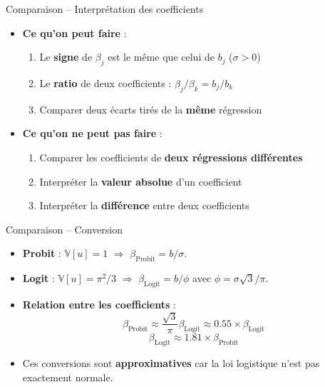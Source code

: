 \documentclass[11pt,aspectratio=169]{beamer}
\newcommand{\V}{\mathbb{V}}
\begin{document}
\begin{frame}{Comparaison -- Interprétation des coefficients}

\begin{itemize}

\item \textbf{Ce qu'on peut faire} :
  \begin{enumerate}
  \item Le \textbf{signe} de $\beta_j$ est le même que celui de $b_j$
    ($\sigma > 0$)\newline
  \item Le \textbf{ratio} de deux coefficients : $\beta_j/\beta_k = b_j/b_k$\newline
  \item Comparer deux écarts tirés de la \textbf{même} régression
  \end{enumerate}

\item \textbf{Ce qu'on ne peut pas faire} :
  \begin{enumerate}
  \item Comparer les coefficients de \textbf{deux régressions différentes}\newline
  \item Interpréter la \textbf{valeur absolue} d'un coefficient\newline
  \item Interpréter la \textbf{différence} entre deux coefficients
  \end{enumerate}

\end{itemize}

\end{frame}

\begin{frame}{Comparaison -- Conversion}

\begin{itemize}

\item \textbf{Probit} : $\V[u] = 1$ $\Rightarrow$
  $\beta_{\text{Probit}} = b/\sigma$.\newline

\item \textbf{Logit} : $\V[u] = \pi^2/3$ $\Rightarrow$
  $\beta_{\text{Logit}} = b/\phi$ avec
  $\phi = \sigma\sqrt{3}/\pi$.\newline

\item \textbf{Relation entre les coefficients} :
  \[
  \boxed{\beta_{\text{Probit}} \approx \frac{\sqrt{3}}{\pi} \beta_{\text{Logit}} \approx 0.55 \times \beta_{\text{Logit}}}
  \]
  \[
  \boxed{\beta_{\text{Logit}} \approx 1.81 \times \beta_{\text{Probit}}}
  \]

\item Ces conversions sont \textbf{approximatives} car la loi logistique
  n'est pas exactement normale.

\end{itemize}

\end{frame}
\end{document}
